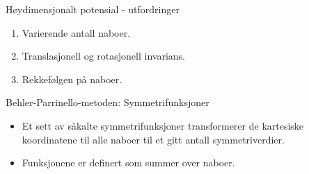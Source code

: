 \documentclass{beamer}
\begin{document}
\begin{frame}

\begin{block}{Høydimensjonalt potensial - utfordringer}
 \begin{enumerate} 
  \item Varierende antall naboer. 
  \item Translasjonell og rotasjonell invarians. 
  \item Rekkefølgen på naboer. 
 \end{enumerate}
\end{block}

\begin{block}{Behler-Parrinello-metoden: Symmetrifunksjoner}
 \begin{itemize}
  \item Et sett av såkalte symmetrifunksjoner transformerer de kartesiske koordinatene til alle naboer 
  til et gitt antall symmetriverdier.
  \item Funksjonene er definert som summer over naboer. 
 \end{itemize}
\end{block}

\end{frame}
\end{document}
